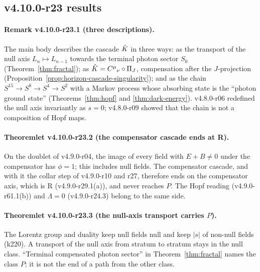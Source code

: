 \subsection*{v4.10.0-r23 results}
\label{subsec:v4100-r23-results}

\paragraph{Remark v4.10.0-r23.1 (three descriptions).}
The main body describes the cascade \(\hat{K}\) in three ways: as the transport of the null axis \(L_n\mapsto L_{n-1}\) towards the terminal
photon sector \(S_0\) (Theorem~\ref{thm:fractal}); as \(\hat{K}=C^\mu{}_\nu\circ\Pi_J\), compensation after the \(J\)-projection
(Proposition~\ref{prop:horizon-cascade-singularity}); and as the chain \(S^{15}\to S^8\to S^4\to S^2\) with a Markov process whose absorbing
state is the ``photon ground state'' (Theorems~\ref{thm:hopf} and \ref{thm:dark-energy}).  v4.8.0-r06 redefined the null axis invariantly as
\(s=0\); v4.8.0-r09 showed that the chain is not a composition of Hopf maps.

\paragraph{Theoremlet v4.10.0-r23.2 (the compensator cascade ends at R).}
On the doublet of v4.9.0-r04, the image of every field with \(E+B\ne0\) under the compensator has \(\phi=1\); this includes null fields.
The compensator cascade, and with it the collar step of v4.9.0-r10 and r27, therefore ends on the compensator axis, which is R
(v4.9.0-r29.1(a)), and never reaches \(P\).  The Hopf reading (v4.9.0-r61.1(b)) and \(\Lambda=0\) (v4.9.0-r24.3) belong to the same side.

\paragraph{Theoremlet v4.10.0-r23.3 (the null-axis transport carries \(P\)).}
The Lorentz group and duality keep null fields null and keep \(|s|\) of non-null fields (k220).  A transport of the null axis from
stratum to stratum stays in the null class.  ``Terminal compensated photon sector'' in Theorem~\ref{thm:fractal} names the class \(P\); it is
not the end of a path from the other class.

